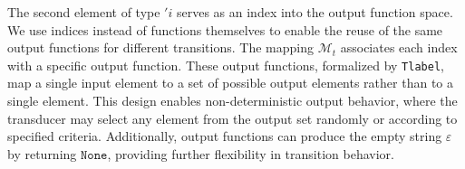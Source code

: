The second element of type $'i$ serves as an index into the output function space. 
%
We use indices instead of functions themselves to enable the reuse of the same output functions for different transitions.
%
The mapping $\mathcal{M}_t$ associates each index with a specific output function. These output functions, formalized by \texttt{Tlabel}, map a single input element to a set of possible output elements rather than to a single element. This design enables non-deterministic output behavior, where the transducer may select any element from the output set randomly or according to specified criteria. Additionally, output functions can produce the empty string $\varepsilon$ by returning $\texttt{None}$, providing further flexibility in transition behavior.




